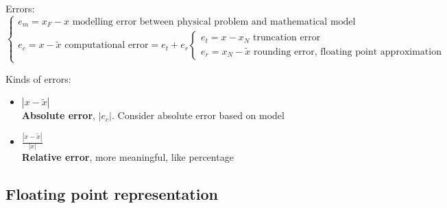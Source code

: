 Errors:
$$
\begin{cases}
    e_m=x_F-x\text{ modelling error between physical problem and mathematical model}\\
    e_c=x-\tilde{x}\text{ computational error}=e_t+e_r
    \begin{cases}    
        e_t=x-x_N\text{ truncation error}\\
        e_r=x_N-\tilde{x}\text{ rounding error, floating point approximation}
    \end{cases}
\end{cases}
$$

Kinds of errors:
\begin{itemize}
    \item $|x-\tilde{x}|$\\
    \textbf{Absolute error}, $|e_c|$. Consider absolute error based on model
    \item $\frac{|x-\tilde{x}|}{|x|}$\\
    \textbf{Relative error}, more meaningful, like percentage
\end{itemize}

\subsection{Floating point representation}